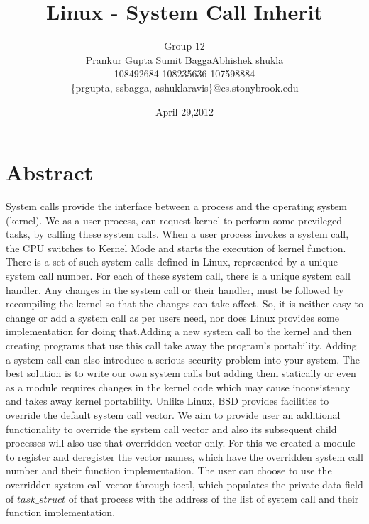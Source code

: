\documentclass[11pt]{article}
\begin{document}
\title{\textbf{Linux - System Call Inherit}}
\author{Group 12 \\ Prankur Gupta\hspace{1.9cm} Sumit Bagga\hspace{1.9cm}Abhishek shukla\\
108492684 \hspace{2.5cm}108235636 \hspace{2.5cm}107598884\\ \{prgupta, ssbagga, ashuklaravis\}@cs.stonybrook.edu}
\date{April 29,2012}
\maketitle

\section{Abstract}
\medskip
System calls provide the interface between a process and the operating
 system (kernel). We as a user process, can request kernel to perform some
previleged tasks, by calling these system calls. When a user process invokes
a system call, the CPU switches to Kernel Mode and starts the execution of
kernel function. There is a set of such system calls defined in Linux, represented
by a unique system call number. For each of these system call, there is a unique
system call handler. Any changes in the system call or their handler, must be followed
by recompiling the kernel so that  the changes can take affect. So, it is neither easy to
change or add a system call as per users need, nor does Linux provides some
implementation for doing that.Adding a new system call to the kernel and then 
creating programs that use this call take away the program's portability.
Adding a system call can also introduce a serious security problem into your system. 
The best solution is to write our own system calls but adding them statically or even as a module
requires changes in the kernel code which may cause inconsistency and takes away kernel portability.
Unlike Linux, BSD provides facilities to override the default system call vector. We aim to 
provide user an additional functionality to override the system call vector and also its
subsequent child processes will also use that overridden vector only. For this we created
a module to register and deregister the vector names, which have the overridden system call
number and their function implementation. The user can choose to use the overridden system call vector through ioctl, which populates the private data field of $task\_struct$ of that process with the address of the list of system call and their function
implementation. 
\end{document}
